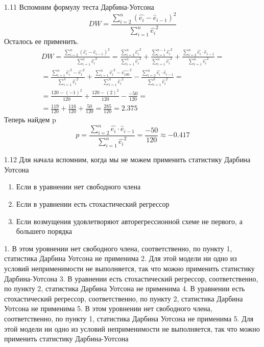 \protect \hypertarget {soln:1.11}{}
\begin{solution}{{1.11}}
Вспомним формулу теста Дарбина-Уотсона
\[DW = \frac{\sum_{i = 2}^n (\hat{e_i} - \hat{e}_{i - 1})^2}{\sum_{i = 1}^n \hat{e_i}^2}\]
Осталось ее применить. 
\begin{align*}
DW = \frac{\sum_{i = 2}^n (\hat{e_i} - \hat{e}_{i - 1})^2}{\sum_{i = 1}^n \hat{e_i}^2} = \frac{\sum_{i = 2}^n \hat{e_i}^2}{\sum_{i = 1}^n \hat{e_i}^2} + \frac{\sum_{i = 1}^{n-1} \hat{e_i}^2}{\sum_{i = 1}^n \hat{e_i}^2}  + \frac{\sum_{i = 2}^n \hat{e_i} \cdot \hat{e}_{i - 1}}{\sum_{i = 1}^n \hat{e_i}^2}=\\ 
= \frac{\sum_{i = 1}^n \hat{e_i}^2 - \hat{e_1}^2}{\sum_{i = 1}^n \hat{e_i}^2} + \frac{\sum_{i = 1}^{n} \hat{e_i}^2 - \hat{e_{100}}^2}{\sum_{i = 1}^n \hat{e_i}^2}  - \frac{\sum_{i = 2}^n \hat{e_i} \cdot \hat{e}_{i - 1}}{\sum_{i = 1}^n \hat{e_i}^2}=\\
=  \frac{120 - (-1)^2}{120} + \frac{120 - (2)^2}{120} - \frac{-50}{120} =\\
= \frac{119}{120} + \frac{116}{120} + \frac{50}{120} = \frac{285}{120} = 2.375
\end{align*}
Теперь найдем p
\[p = \frac{\sum_{i = 2}^n \hat{e_i} \cdot \hat{e}_{i - 1}}{\sum_{i = 1}^n \hat{e_i}^2} = \frac{-50}{120} \approx -0.417\]
\end{solution}

\protect \hypertarget {soln:1.12}{}
\begin{solution}{{1.12}}
Для начала вспомним, когда мы не можем применить статистику Дарбина Уотсона
\begin{enumerate}
    \item Если в уравнении нет свободного члена
    \item Если в уравнении есть стохастический регрессор
    \item Если возмущения удовлетворяют авторегрессионной схеме не первого, а большего порядка
\end{enumerate}
1. В этом уровнении нет свободного члена, соответственно, по пункту 1, статистика Дарбина Уотсона не применима
2. Для этой модели ни одно из условий неприменимости не выполняется, так что можно применить статистику Дарбина-Уотсона
3. В уравнении есть стохастический регрессор, соответственно, по пункту 2, статистика Дарбина Уотсона не применима
4. В уравнении есть стохастический регрессор, соответственно, по пункту 2, статистика Дарбина Уотсона не применима
5. В этом уровнении нет свободного члена, соответственно, по пункту 1, статистика Дарбина Уотсона не применима
5. Для этой модели ни одно из условий неприменимости не выполняется, так что можно применить статистику Дарбина-Уотсона
\end{solution}


